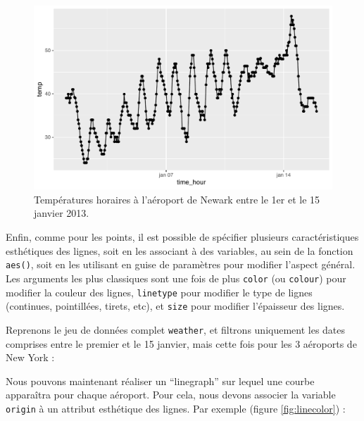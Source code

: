 \documentclass[
  a4paper,
]{article}
\newenvironment{Shaded}{\begin{snugshade}}{\end{snugshade}}
\newcommand{\DecValTok}[1]{\textcolor[rgb]{0.69,0.50,0.00}{#1}}
\newcommand{\KeywordTok}[1]{\textcolor[rgb]{0.12,0.11,0.11}{\textbf{#1}}}
\newcommand{\NormalTok}[1]{\textcolor[rgb]{0.12,0.11,0.11}{#1}}
\newcommand{\OperatorTok}[1]{\textcolor[rgb]{0.12,0.11,0.11}{#1}}
\newcommand{\StringTok}[1]{\textcolor[rgb]{0.75,0.01,0.01}{#1}}
\begin{document}
\begin{figure}[htpb]

{\centering \includegraphics[width=0.9\linewidth]{figure/lineplotgraph-1} 

}

\caption{Températures horaires à l'aéroport de Newark entre le 1er et le 15 janvier 2013.}\label{fig:lineplotgraph}
\end{figure}

Enfin, comme pour les points, il est possible de spécifier plusieurs caractéristiques esthétiques des lignes, soit en les associant à des variables, au sein de la fonction \texttt{aes()}, soit en les utilisant en guise de paramètres pour modifier l'aspect général. Les arguments les plus classiques sont une fois de plus \texttt{color} (ou \texttt{colour}) pour modifier la couleur des lignes, \texttt{linetype} pour modifier le type de lignes (continues, pointillées, tirets, etc), et \texttt{size} pour modifier l'épaisseur des lignes.

Reprenons le jeu de données complet \texttt{weather}, et filtrons uniquement les dates comprises entre le premier et le 15 janvier, mais cette fois pour les 3 aéroports de New York :

\begin{Shaded}
\end{Shaded}

Nous pouvons maintenant réaliser un ``linegraph'' sur lequel une courbe apparaîtra pour chaque aéroport. Pour cela, nous devons associer la variable \texttt{origin} à un attribut esthétique des lignes. Par exemple (figure \ref{fig:linecolor}) :
\end{document}
